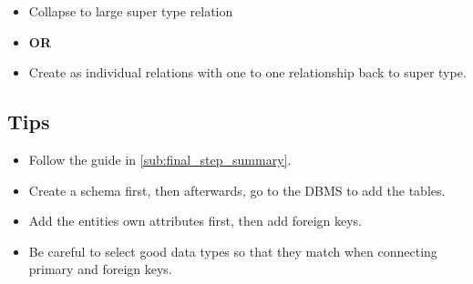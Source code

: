 \begin{itemize}
    \item Collapse to large super type relation
    \item[] \textbf{OR}
    \item Create as individual relations with one to one relationship back to super type.
\end{itemize}

\subsection{Tips}\label{sub:tips}

\begin{itemize}
    \item Follow the guide in \cref{sub:final_step_summary}.
    \item Create a schema first, then afterwards, go to the DBMS to add the tables.
    \item Add the entities own attributes first, then add foreign keys.
    \item Be careful to select good data types so that they match when connecting primary and foreign keys.
\end{itemize}

